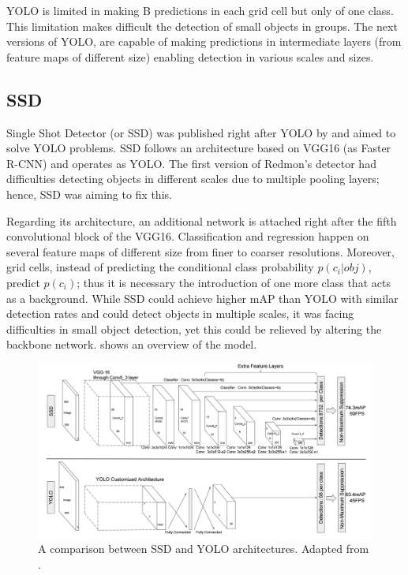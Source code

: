 YOLO is limited in making B predictions in each grid cell but only of one class. This limitation makes difficult the detection of small objects in groups. The next versions of YOLO, are capable of making predictions in intermediate layers (from feature maps of different size) enabling detection in various scales and sizes. 
 
\subsection{SSD}
Single Shot Detector (or SSD) was published right after YOLO by \cite{liu2016ssd} and aimed to solve YOLO problems. SSD follows an architecture based on VGG16 (as Faster R-CNN) and operates as YOLO. The first version of Redmon's detector had difficulties detecting objects in different scales due to multiple pooling layers; hence, SSD was aiming to fix this. 

Regarding its architecture, an additional network is attached right after the fifth convolutional block of the VGG16. Classification and regression happen on several feature maps of different size from finer to coarser resolutions. Moreover, grid cells, instead of predicting the conditional class probability $p(c_i|obj)$, predict $p(c_i)$; thus it is necessary the introduction of one more class that acts as a background. While SSD could achieve higher mAP than YOLO with similar detection rates and could detect objects in multiple scales, it was facing difficulties in small object detection, yet this could be relieved by altering the backbone network.   shows an overview of the model.
 
\begin{figure}[!htb]
  \centering
  \includegraphics[width=12cm]{figures/ch2/fig6.png}
  \caption{A comparison between SSD and YOLO architectures. Adapted from \cite{liu2016ssd}.}
  \label{fig6}
\end{figure} 
 
